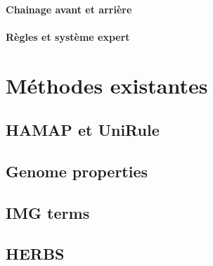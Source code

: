 \begin{refsegment}
    \paragraph{Chainage avant et arrière} %
    \paragraph{Règles et système expert}
    
    \section{Méthodes existantes}
    \subsection{HAMAP et UniRule}
    \subsection{Genome properties}
    \subsection{IMG terms}
    \subsection{HERBS}
    
    \subbibliography
\end{refsegment}